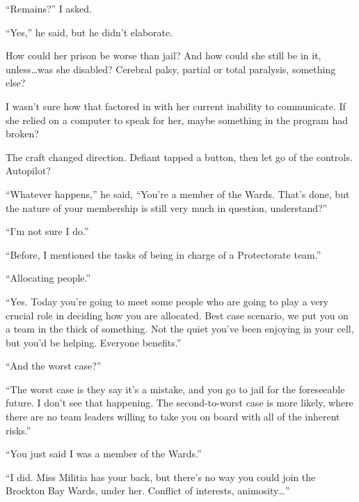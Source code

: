 ``Remains?''  I asked.



``Yes,'' he said, but he didn't elaborate.



How could her prison be worse than jail?  And how could she still be in it, unless\ldots was she disabled?  Cerebral palsy, partial or total paralysis, something else?



I wasn't sure how that factored in with her current inability to communicate.  If she relied on a computer to speak for her, maybe something in the program had broken?



The craft changed direction.  Defiant tapped a button, then let go of the controls.  Autopilot?



``Whatever happens,'' he said, ``You're a member of the Wards.  That's done, but the nature of your membership is still very much in question, understand?''



``I'm not sure I do.''



``Before, I mentioned the tasks of being in charge of a Protectorate team.''



``Allocating people.''



``Yes.  Today you're going to meet some people who are going to play a very crucial role in deciding how you are allocated.  Best case scenario, we put you on a team in the thick of something.  Not the quiet you've been enjoying in your cell, but you'd be helping.  Everyone benefits.''



``And the worst case?''



``The worst case is they say it's a mistake, and you go to jail for the foreseeable future.  I don't see that happening.  The second-to-worst case is more likely, where there are no team leaders willing to take you on board with all of the inherent risks.''



``You just said I was a member of the Wards.''



``I did.  Miss Militia has your back, but there's no way you could join the Brockton Bay Wards, under her.  Conflict of interests, animosity\ldots''



